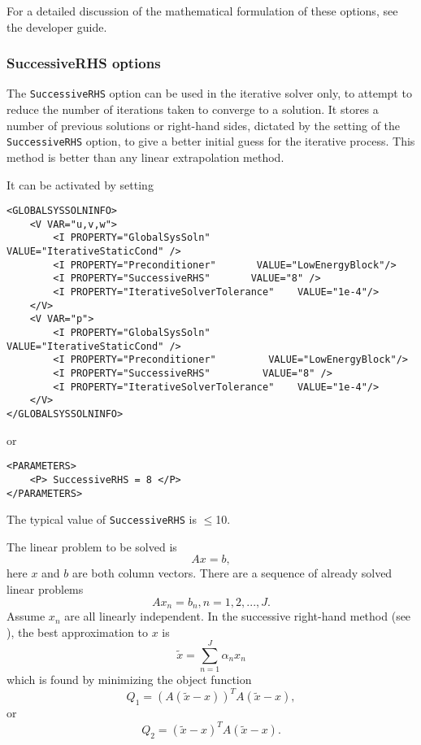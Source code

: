 For a detailed discussion of the mathematical formulation of these options, see
the developer guide.

\subsubsection{SuccessiveRHS options}

The \texttt{SuccessiveRHS} option can be used in the iterative solver only, to
attempt to reduce the number of iterations taken to converge to a solution. It
stores a number of previous solutions or right-hand sides, dictated by the setting of the
\texttt{SuccessiveRHS} option, to give a better initial guess for the iterative
process. This  method is better than any linear extrapolation method.

It can be activated by setting
\begin{lstlisting}[style=XMLStyle]
<GLOBALSYSSOLNINFO>
    <V VAR="u,v,w">
        <I PROPERTY="GlobalSysSoln"         VALUE="IterativeStaticCond" />
        <I PROPERTY="Preconditioner"       VALUE="LowEnergyBlock"/>
        <I PROPERTY="SuccessiveRHS"       VALUE="8" />
        <I PROPERTY="IterativeSolverTolerance"    VALUE="1e-4"/>
    </V>
    <V VAR="p">
        <I PROPERTY="GlobalSysSoln"           VALUE="IterativeStaticCond" />
        <I PROPERTY="Preconditioner"         VALUE="LowEnergyBlock"/>
        <I PROPERTY="SuccessiveRHS"         VALUE="8" />
        <I PROPERTY="IterativeSolverTolerance"    VALUE="1e-4"/>
    </V>
</GLOBALSYSSOLNINFO>
\end{lstlisting}
or
\begin{lstlisting}[style=XMLStyle]
<PARAMETERS>
    <P> SuccessiveRHS = 8 </P>
</PARAMETERS>
\end{lstlisting}
The typical value of \texttt{SuccessiveRHS} is $\le$10.

The linear problem to be solved is
\begin{equation}\label{eq:linearEquationNew}
A x = b,
\end{equation}
here $x$ and $b$ are both column vectors.
There are a sequence of  already solved linear problems
\begin{equation}\label{eq:linearEquationOld}
A x_n = b_n, n = 1, 2, ..., J.
\end{equation}
Assume $x_n$ are all linearly independent.
In the successive right-hand method (see \cite{FISCHER1998193}), the best approximation to $x$ is
\begin{equation}\label{eq:approximate}
\tilde{x}=\sum_{n=1}^J\alpha_n x_n
\end{equation}
which is found by minimizing the object function
\begin{equation}\label{eq:objectFunction1}
Q_1 = \left(A(\tilde{x}-x)\right)^TA(\tilde{x}-x),
\end{equation}
or
\begin{equation}\label{eq:objectFunction2}
Q_2 = (\tilde{x}-x)^TA(\tilde{x}-x).
\end{equation}

